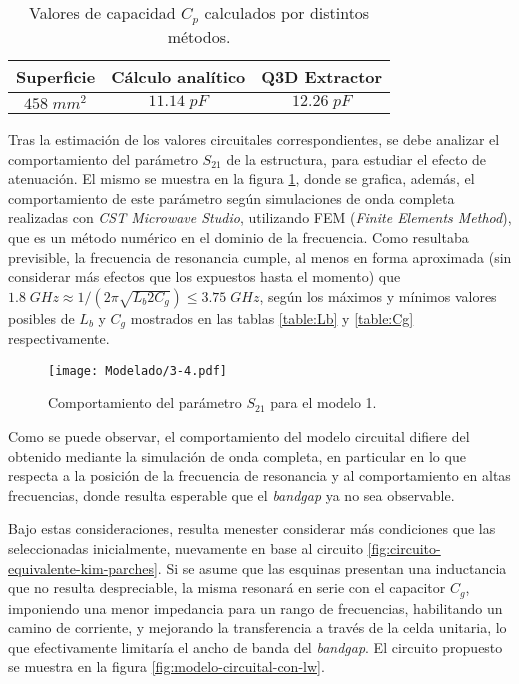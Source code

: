 \begin{table}
	\centering
	\begin{tabular}{|c|c|c|}
		\hline 
		Superficie & Cálculo analítico & Q3D Extractor\\ 
		\hline 
		$458\; mm^2$ & $11.14\;pF$ & $12.26\;pF$\\ 
		\hline 
	\end{tabular}
	\caption{Valores de capacidad $C_p$ calculados por distintos métodos.}
	\label{table:Cp-modelo1-circuital}
\end{table}

Tras la estimación de los valores circuitales correspondientes, se debe analizar el comportamiento del parámetro $S_{21}$ de la estructura, para estudiar el efecto de atenuación. El mismo se muestra en la figura \ref{fig:s21-modelo1}, donde se grafica, además, el comportamiento de este parámetro según simulaciones de onda completa realizadas con \textit{CST Microwave Studio}, utilizando FEM (\textit{Finite Elements Method}), que es un método numérico en el dominio de la frecuencia. Como resultaba previsible, la frecuencia de resonancia cumple, al menos en forma aproximada (sin considerar más efectos que los expuestos hasta el momento) que $1.8\;GHz \approx 1/(2\pi\sqrt{L_{b} 2C_{g}}) \leq 3.75 \;GHz $, según los máximos y mínimos valores posibles de $L_b$ y $C_g$ mostrados en las tablas \ref{table:Lb} y \ref{table:Cg} respectivamente.

\begin{figure}[h]
	\centering
	\texttt{[image: Modelado/3-4.pdf]}
	\caption{Comportamiento del parámetro $S_{21}$ para el modelo 1.}
	\label{fig:s21-modelo1}
\end{figure}

Como se puede observar, el comportamiento del modelo circuital difiere del obtenido mediante la simulación de onda completa, en particular en lo que respecta a la posición de la frecuencia de resonancia y al comportamiento en altas frecuencias, donde resulta esperable que el \textit{bandgap} ya no sea observable.

Bajo estas consideraciones, resulta menester considerar más condiciones que las seleccionadas inicialmente, nuevamente en base al circuito \ref{fig:circuito-equivalente-kim-parches}. Si se asume que las esquinas presentan una inductancia que no resulta despreciable, la misma resonará en serie con el capacitor $C_g$, imponiendo una menor impedancia para un rango de frecuencias, habilitando un camino de corriente, y mejorando la transferencia a través de la celda unitaria, lo que efectivamente limitaría el ancho de banda del \textit{bandgap}. El circuito propuesto se muestra en la figura \ref{fig:modelo-circuital-con-lw}. 

